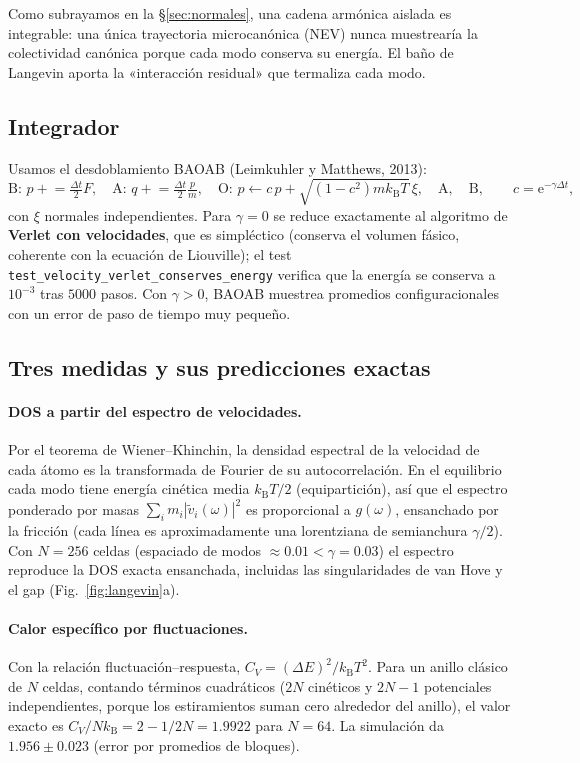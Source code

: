 \documentclass[11pt,a4paper]{article}
\newcommand{\kB}{k_{\mathrm B}}
\newcommand{\ee}{\mathrm{e}}
\newcommand{\code}[1]{\texttt{#1}}
\begin{document}
Como subrayamos en la \S\ref{sec:normales}, una cadena armónica aislada es integrable: una
única trayectoria microcanónica (NEV) nunca muestrearía la colectividad
canónica porque cada modo conserva su energía. El baño de Langevin aporta la
«interacción residual» que termaliza cada modo.

\subsection{Integrador}

Usamos el desdoblamiento BAOAB (Leimkuhler y Matthews, 2013):
\[
\text{B: } p\mathrel{+}=\tfrac{\Delta t}{2}F,\quad
\text{A: } q\mathrel{+}=\tfrac{\Delta t}{2}\tfrac{p}{m},\quad
\text{O: } p\leftarrow c\,p+\sqrt{(1-c^2)m\kB T}\,\xi,\quad
\text{A},\quad \text{B},
\qquad c=\ee^{-\gamma\Delta t},
\]
con $\xi$ normales independientes. Para $\gamma=0$ se reduce exactamente al
algoritmo de \textbf{Verlet con velocidades}, que es simpléctico (conserva el
volumen fásico, coherente con la ecuación de Liouville); el test
\code{test\_velocity\_verlet\_conserves\_energy} verifica que la energía se
conserva a $10^{-3}$ tras $5000$ pasos. Con $\gamma>0$, BAOAB muestrea
promedios configuracionales con un error de paso de tiempo muy pequeño.

\subsection{Tres medidas y sus predicciones exactas}

\paragraph{DOS a partir del espectro de velocidades.} Por el teorema de
Wiener–Khinchin, la densidad espectral de la velocidad de cada átomo es la
transformada de Fourier de su autocorrelación. En el equilibrio cada modo
tiene energía cinética media $\kB T/2$ (equipartición), así que el espectro
ponderado por masas $\sum_i m_i|\tilde v_i(\omega)|^2$ es proporcional a
$g(\omega)$, ensanchado por la fricción (cada línea es aproximadamente una
lorentziana de semianchura $\gamma/2$). Con $N=256$ celdas (espaciado de modos
$\approx0.01<\gamma=0.03$) el espectro reproduce la DOS exacta ensanchada,
incluidas las singularidades de van Hove y el gap (Fig.~\ref{fig:langevin}a).

\paragraph{Calor específico por fluctuaciones.} Con la relación
fluctuación–respuesta, $C_V=(\Delta E)^2/\kB T^2$. Para un anillo clásico de
$N$ celdas, contando términos cuadráticos ($2N$ cinéticos y $2N-1$ potenciales
independientes, porque los estiramientos suman cero alrededor del anillo), el
valor exacto es $C_V/N\kB=2-1/2N=1.9922$ para $N=64$. La simulación da
$1.956\pm0.023$ (error por promedios de bloques).
\end{document}
